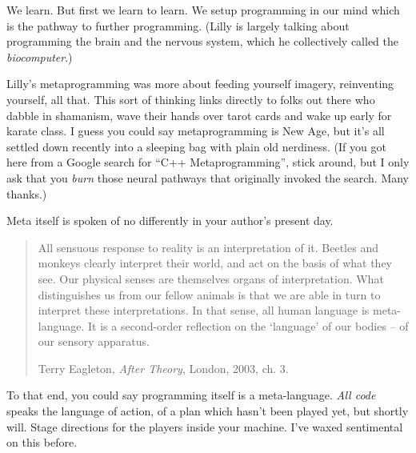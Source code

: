 \documentclass[12pt,twoside]{report}
\begin{document}
We learn.  But first we learn to learn.  We setup programming in our
mind which is the pathway to further programming.  (Lilly is largely
talking about programming the brain and the nervous system, which he
collectively called the {\em biocomputer}.)

Lilly's metaprogramming was more about feeding yourself imagery,
reinventing yourself, all that. This sort of thinking links directly
to folks out there who dabble in shamanism, wave their hands over
tarot cards and wake up early for karate class.  I guess you could say
metaprogramming is New Age, but it's all settled down recently into a
sleeping bag with plain old nerdiness.  (If you got here from a Google
search for ``C++ Metaprogramming'', stick around, but I only ask that
you {\em burn} those neural pathways that originally invoked the
search.  Many thanks.)

Meta itself is spoken of no differently in your author's present day.

\begin{quote}
All sensuous response to reality is an interpretation of it.  Beetles
and monkeys clearly interpret their world, and act on the basis of
what they see. Our physical senses are themselves organs of
interpretation.  What distinguishes us from our fellow animals is that
we are able in turn to interpret these interpretations.  In that
sense, all human language is meta-language.  It is a second-order
reflection on the `language' of our bodies -- of our sensory
apparatus.

Terry Eagleton, {\em After Theory}, London, 2003, ch. 3.

\end{quote}


To that end, you could say programming itself is a meta-language.
{\em All code} speaks the language of action, of a plan which hasn't
been played yet, but shortly will.  Stage directions for the players
inside your machine.  I've waxed sentimental on this before.
\end{document}
